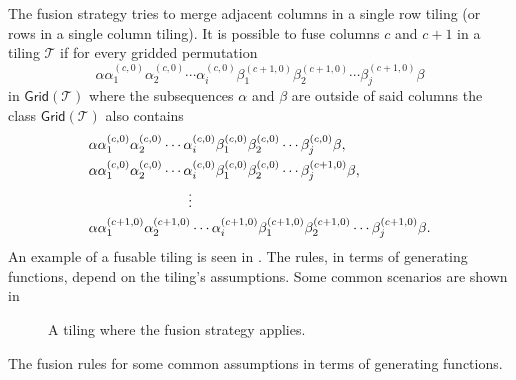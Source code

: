 The fusion strategy tries to merge adjacent columns in a single row tiling (or rows in a single column tiling). It is possible to fuse columns $c$ and $c+1$ in a tiling $\mathcal{T}$ if for every gridded permutation
\[
\alpha \alpha_1^{(c,0)}\alpha_2^{(c,0)}\dotsm\alpha_i^{(c,0)}\beta_1^{(c+1,0)}\beta_2^{(c+1,0)}\dotsm\beta_j^{(c+1,0)} \beta 
\]
in $\textsf{Grid}(\mathcal{T})$ where the subsequences $\alpha$ and $\beta$ are outside of said columns the class $\textsf{Grid}(\mathcal{T})$ also contains
\begin{align*}
    &\alpha\alpha_1^{(c,0)}\alpha_2^{(c,0)}\dotsm\alpha_i^{(c,0)}\beta_1^{(c,0)}\beta_2^{(c,0)}\dotsm\beta_j^{(c,0)}\beta,\\
    &\alpha\alpha_1^{(c,0)}\alpha_2^{(c,0)}\dotsm\alpha_i^{(c,0)}\beta_1^{(c,0)}\beta_2^{(c,0)}\dotsm\beta_j^{(c+1,0)}\beta,\\
    &\hspace{2.5cm}\vdots\\
    &\alpha\alpha_1^{(c+1,0)}\alpha_2^{(c+1,0)}\dotsm\alpha_i^{(c+1,0)}\beta_1^{(c+1,0)}\beta_2^{(c+1,0)}\dotsm\beta_j^{(c+1,0)}\beta.
\end{align*}
An example of a fusable tiling is seen in . The rules, in terms of generating functions, depend on the tiling's assumptions. Some common scenarios are shown in 

\begin{figure}[ht!]
    \centering
    
    \caption{A tiling where the fusion strategy applies.}
    \label{fig:fusable}
\end{figure}

\begin{table}[ht!]
    \centering
    
    \caption{The fusion rules for some common assumptions in terms of generating functions.}
    \label{tab:fusegf}
\end{table}

